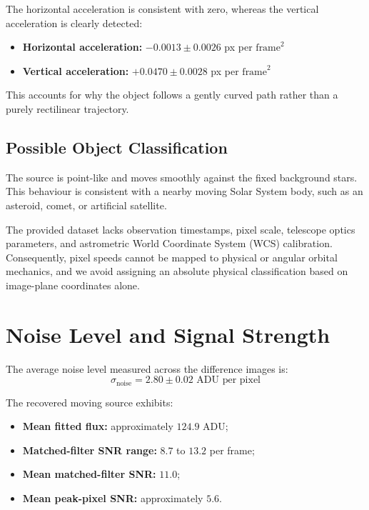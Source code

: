 \documentclass[11pt,a4paper]{article}
\begin{document}
The horizontal acceleration is consistent with zero, whereas the vertical acceleration is clearly detected:
\begin{itemize}[noitemsep]
    \item \textbf{Horizontal acceleration:} $-0.0013 \pm 0.0026$ px per $\text{frame}^2$
    \item \textbf{Vertical acceleration:} $+0.0470 \pm 0.0028$ px per $\text{frame}^2$
\end{itemize}

This accounts for why the object follows a gently curved path rather than a purely rectilinear trajectory.

\subsection{Possible Object Classification}

The source is point-like and moves smoothly against the fixed background stars. This behaviour is consistent with a nearby moving Solar System body, such as an asteroid, comet, or artificial satellite.

The provided dataset lacks observation timestamps, pixel scale, telescope optics parameters, and astrometric World Coordinate System (WCS) calibration. Consequently, pixel speeds cannot be mapped to physical or angular orbital mechanics, and we avoid assigning an absolute physical classification based on image-plane coordinates alone.

\section{Noise Level and Signal Strength}

The average noise level measured across the difference images is:
\begin{equation}
    \sigma_{\text{noise}} = 2.80 \pm 0.02 \text{ ADU per pixel}
\end{equation}

The recovered moving source exhibits:
\begin{itemize}[noitemsep]
    \item \textbf{Mean fitted flux:} approximately $124.9$ ADU;
    \item \textbf{Matched-filter SNR range:} $8.7$ to $13.2$ per frame;
    \item \textbf{Mean matched-filter SNR:} $11.0$;
    \item \textbf{Mean peak-pixel SNR:} approximately $5.6$.
\end{itemize}
\end{document}
